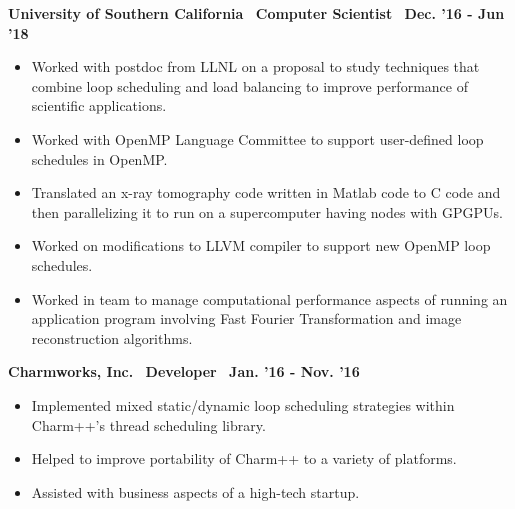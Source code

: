 \textbf{University of Southern California$\>$$\>$$\>$$\>$Computer Scientist$\>$$\>$$\>$$\>$Dec. '16 - Jun '18}
\vspace*{-0.0in} 
\begin{itemize}
\item Worked with postdoc from LLNL on a proposal to study techniques that combine loop scheduling and load balancing to improve
performance of scientific applications.
\item Worked with OpenMP Language Committee to support user-defined loop schedules in OpenMP.
\item Translated an x-ray tomography code written in Matlab code to C code and then parallelizing it to run on a supercomputer having nodes with GPGPUs. 
\item Worked on modifications to LLVM compiler to support new OpenMP loop schedules. 
\item Worked in team to manage computational performance aspects of running an application program involving Fast Fourier Transformation and image reconstruction algorithms. 
\end{itemize}

\textbf{Charmworks, Inc.$\>$$\>$$\>$$\>$Developer$\>$$\>$$\>$$\>$Jan. '16 - Nov. '16}
\vspace*{-0.0in}
\begin{itemize}
\item Implemented mixed static/dynamic loop scheduling
strategies within Charm++'s thread scheduling library.
\item Helped to improve portability of Charm++ to a variety of platforms. 
\item Assisted with business aspects of a high-tech startup. 
\end{itemize} 

